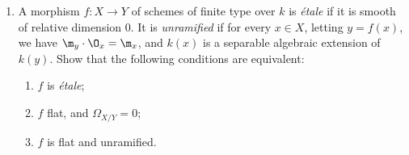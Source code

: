 \documentclass[12pt]{amsart}
\begin{document}
\begin{enumerate}
  \item[10.3] {
      A morphism $f:X\to Y$ of schemes of finite type over $k$ is \emph{\'etale} if it is smooth of relative dimension 0.
      It is \emph{unramified} if for every $x\in X$, letting $y=f(x)$, we have $\m_y\cdot \O_x=\m_x$, and $k(x)$ is a separable algebraic extension of $k(y)$.
      Show that the following conditions are equivalent:
      \begin{enumerate}[label=(\roman*)]
        \item $f$ is \emph{\'etale};
        \item $f$ flat, and $\Omega_{X/Y}= 0$;
        \item $f$ is flat and unramified.
      \end{enumerate}
    }
\end{enumerate}
\end{document}
